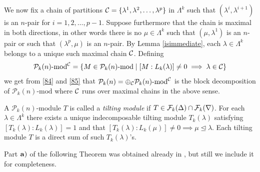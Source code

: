 \documentclass[10pt,hidelinks]{article}
\newcommand{\ParAlg}{{\mathcal P }_{k}}
\numberwithin{equation}{section}
\begin{document}
\medskip
We now fix a chain of partitions ${\cal C}= \{ \lambda^1, \lambda^2, \ldots, \lambda^p \} $ 
in $ \Lambda^k $ such that $(\lambda^i, \lambda^{i+1} ) $ is an $ n$-pair
for $ i=1,2,\ldots, p-1$. Suppose furthermore that the chain is maximal in both directions, in other words 
there is no $ \mu \in \Lambda^k $ such that $ (\mu, \lambda^1) $ is an $n$-pair or such that 
$ (\lambda^p, \mu ) $ is an $n$-pair. By Lemma \ref{isimmediate}, each $ \lambda \in \Lambda^k $ belongs to
a unique such maximal chain $ \cal C$.
Defining
\begin{equation}
  \ParAlg(n) \mbox{-mod}^{\cal C} = \{ M \in \ParAlg(n) \mbox{-mod}  \mid  [M:L_k(\lambda)] \neq 0
  \implies \lambda \in {\cal C}\} 
 \end{equation}
we get from \eqref{84} and \eqref{85} that 
$ \ParAlg(n ) = \oplus_{\cal C} \ParAlg(n) \mbox{-mod}^{\cal C} $ is the block decomposition
of $  \ParAlg(n) \mbox{-mod} $ where $ \cal C$ runs over maximal chains in the above sense.



\medskip
A $ \ParAlg(n)$-module $T$ is called a {\it tilting module} if $ T \in {\cal F}_k(\Delta) \cap {\cal F}_k(\nabla) $. 
For each $ \lambda \in \Lambda^k $ there exists a unique indecomposable tilting module $ T_k(\lambda) $
satisfying $ [ T_k(\lambda): L_k(\lambda) ] = 1 $ and that $ [ T_k(\lambda): L_k(\mu) ] \neq 0
\implies \mu \unlhd \lambda $. 
Each tilting module $ T $ is a direct sum of such $  T_k(\lambda) $'s. 



\medskip
Part $   { \bf a)} $ of the following Theorem was obtained already
in \cite{PMartin1}, but still we include it for completeness. 
\end{document}
